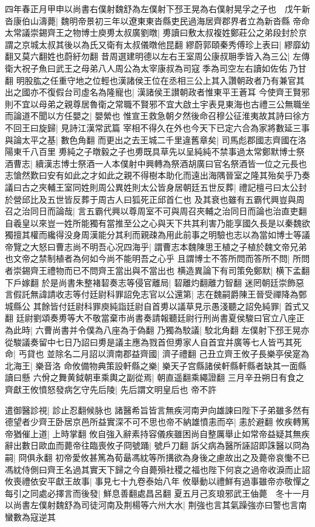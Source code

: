 四年春正月甲申以尚書右僕射魏舒為左僕射下邳王晃為右僕射晃孚之子也　戊午新沓康伯山濤薨|{
	魏明帝景初三年以遼東東沓縣吏民過海居齊郡界者立為新沓縣}
帝命太常議崇錫齊王之物博士庾旉太叔廣劉暾|{
	旉讀曰敷太叔複姓鄭莊公之弟段封於京謂之京城太叔其後以為氏又衛有太叔儀暾他昆翻}
繆蔚郭頤秦秀傅珍上表曰|{
	繆靡幼翻又莫六翻姓也蔚紆勿翻}
昔周選建明德以左右王室周公康叔耼季皆入為三公|{
	左傳衛大祝子魚曰武王之母弟八人周公為太宰康叔為司寇季為司空左右讀如佐佑乃甘翻}
明股肱之任重守地之位輕也漢諸侯王位在丞相三公上其入讚朝政者乃有兼官其出之國亦不復假台司虛名為隆寵也|{
	漢諸侯王讃朝政者惟東平王蒼耳}
今使齊王賢邪則不宜以母弟之親尊居魯衛之常職不賢邪不宜大啟土宇表見東海也古禮三公無職坐而論道不聞以方任嬰之|{
	嬰縈也}
惟宣王救急朝夕然後命召穆公征淮夷故其詩曰徐方不回王曰旋歸|{
	見詩江漢常武篇}
宰相不得久在外也今天下已定六合為家將數延三事與論太平之基|{
	數色角翻}
而更出之去王城二千里違舊章矣|{
	司馬彪郡國志齊國在洛陽東千八百里}
旉純之子暾毅之子也旉既具草先以呈純純不禁事過太常鄭默博士祭酒曹志|{
	續漢志博士祭酒一人本僕射中興轉為祭酒胡廣曰官名祭酒皆一位之元長也}
志愴然歎曰安有如此之才如此之親不得樹本助化而遠出海隅晉室之隆其殆矣乎乃奏議曰古之夾輔王室同姓則周公異姓則太公皆身居朝廷五世反葬|{
	禮記檀弓曰太公封於營邱比及五世皆反葬于周古人曰狐死正邱首仁也}
及其衰也雖有五霸代興豈與周召之治同日而論哉|{
	言五霸代興以尊周室不可與周召夾輔之治同日而論也治直吏翻}
自羲皇以來豈一姓所能獨有當推至公之心與天下共其利害乃能享國久長是以秦魏欲獨擅其權而纔得没身周漢能分其利而親疎為用此前事之明驗也志以為當如博士等議帝覽之大怒曰曹志尚不明吾心况四海乎|{
	謂曹志本魏陳思王植之子植於魏文帝兄弟也文帝之禁制植者為何如今尚不能明吾之心乎}
且謂博士不答所問而答所不問|{
	所問者崇錫齊王禮物而已不問齊王當出與不當出也}
横造異論下有司策免鄭默|{
	横下孟翻下戶嫁翻}
於是尚書朱整褚䂮奏志等侵官離局|{
	䂮離灼翻離力智翻}
迷罔朝廷崇飾惡言假託無諱請收志等付廷尉科罪詔免志官以公還第|{
	志在魏嗣爵陳王晉受禪降為鄄城縣公}
其餘皆付廷尉科罪庾純詣廷尉自首旉以議草見示愚淺聽之詔免純罪|{
	首式又翻}
廷尉劉頌奏旉等大不敬當棄市尚書奏請報聽廷尉行刑尚書夏侯駿曰官立八座正為此時|{
	六曹尚書并令僕為八座為于偽翻}
乃獨為駮議|{
	駮北角翻}
左僕射下邳王晃亦從駿議奏留中七日乃詔曰旉是議主應為戮首但旉家人自首宜并廣等七人皆丐其死命|{
	丐貸也}
並除名二月詔以濟南郡益齊國|{
	濟子禮翻}
己丑立齊王攸子長樂亭侯寔為北海王|{
	樂音洛}
命攸備物典策設軒縣之樂|{
	樂天子宫縣諸侯軒縣軒縣者缺其一面縣讀曰懸}
六佾之舞黄鉞朝車乘輿之副從焉|{
	朝直遥翻乘繩證翻}
三月辛丑朔日有食之齊獻王攸憤怒發病乞守先后陵|{
	先后謂文明皇后也}
帝不許

遣御醫診視|{
	診止忍翻候脉也}
諸醫希旨皆言無疾河南尹向雄諫曰陛下子弟雖多然有德望者少齊王卧居京邑所益實深不可不思也帝不納雄憤恚而卒|{
	恚於避翻}
攸疾轉篤帝猶催上道|{
	上時掌翻}
攸自強入辭素持容儀疾雖困尚自整厲舉止如常帝益疑其無疾辭出數日歐血而薨帝往臨喪攸子冏號踊|{
	號戶刀翻}
訴父病為醫所誣詔即誅醫以冏為嗣|{
	冏俱永翻}
初帝愛攸甚篤為荀朂馮紞等所搆欲為身後之慮故出之及薨帝哀慟不已馮紞侍側曰齊王名過其實天下歸之今自薨殞社稷之福也陛下何哀之過帝收淚而止詔攸喪禮依安平獻王故事|{
	事見七十九卷泰始八年}
攸舉動以禮鮮有過事雖帝亦敬憚之每引之同處必擇言而後發|{
	鮮息善翻處昌呂翻}
夏五月己亥琅邪武王伷薨　冬十一月以尚書左僕射魏舒為司徒河南及荆楊等六州大水|{
	荆強也言其氣躁強亦曰警也言南蠻數為寇逆其}


